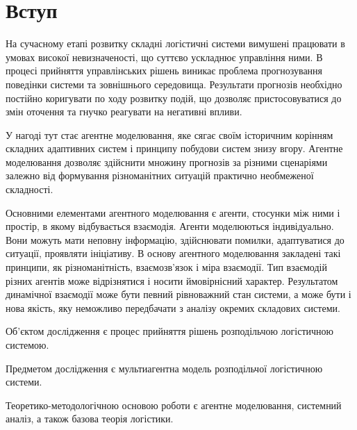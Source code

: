 \section*{Вступ}


На сучасному етапі розвитку складні логістичні системи вимушені працювати в умовах високої невизначеності, що суттєво ускладнює управління ними. 
В процесі прийняття управлінських рішень виникає проблема прогнозування поведінки системи та зовнішнього середовища. 
Результати прогнозів необхідно постійно коригувати по ходу розвитку подій, що дозволяє пристосовуватися до змін оточення та гнучко реагувати на негативні впливи. 

У нагоді тут стає агентне моделювання, яке сягає своїм історичним корінням складних адаптивних систем і принципу побудови систем знизу вгору.
Агентне моделювання дозволяє здійснити множину прогнозів за різними сценаріями залежно від формування різноманітних ситуацій практично необмеженої складності. 

Основними елементами агентного моделювання є агенти, стосунки між ними і простір, в якому відбувається взаємодія. 
Агенти моделюються індивідуально. 
Вони можуть мати неповну інформацію, здійснювати помилки, адаптуватися до ситуації, проявляти ініціативу. 
В основу агентного моделювання закладені такі принципи, як різноманітність, взаємозв’язок і міра взаємодії. 
Тип взаємодій різних агентів може відрізнятися і носити ймовірнісний характер. 
Результатом динамічної взаємодії може бути певний рівноважний стан системи, а може бути і нова якість, яку неможливо передбачати з аналізу окремих складових системи.

Об'єктом дослідження є процес прийняття рішень розподільчою логістичною системою. 

Предметом дослідження є мультиагентна модель розподільчої логістичною системи. 

Теоретико-методологічною основою роботи є агентне моделювання, системний аналіз, а також базова теорія логістики.


